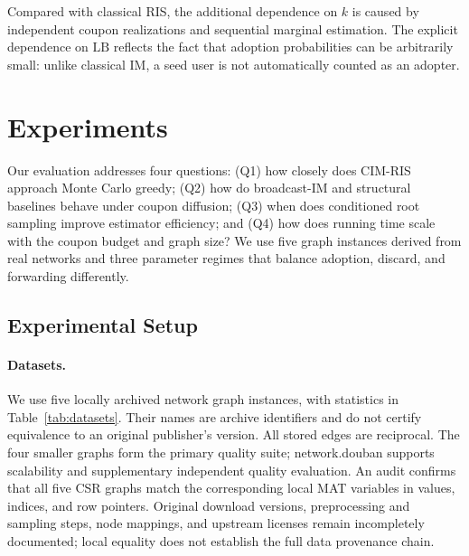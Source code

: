 \documentclass[sigconf,balance=false]{acmart}
\newcommand{\CIMRIS}{\textsc{CIM-RIS}}
\begin{document}
Compared with classical RIS, the additional dependence on $k$ is caused
by independent coupon realizations and sequential marginal estimation.
The explicit dependence on $\mathrm{LB}$ reflects the fact that adoption
probabilities can be arbitrarily small: unlike classical IM, a seed user is
not automatically counted as an adopter.

\section{Experiments}
\label{sec:exp}

Our evaluation addresses four questions:
(Q1) how closely does \CIMRIS{} approach Monte Carlo greedy;
(Q2) how do broadcast-IM and structural baselines behave under coupon
diffusion; (Q3) when does conditioned root sampling improve estimator
efficiency; and (Q4) how does running time scale with the coupon budget
and graph size?
We use five graph instances derived from real networks and three parameter
regimes that balance adoption, discard, and forwarding differently.

\subsection{Experimental Setup}
\label{sec:exp-setup}

\paragraph{Datasets.}
We use five locally archived network graph instances, with statistics in
Table~\ref{tab:datasets}. Their names are archive identifiers and do not
certify equivalence to an original publisher's version.
All stored edges are reciprocal. The four smaller graphs form the primary
quality suite; network.douban supports scalability and supplementary
independent quality evaluation.
An audit confirms that all five CSR graphs match the corresponding local
MAT variables in values, indices, and row pointers. Original download
versions, preprocessing and sampling steps, node mappings, and upstream
licenses remain incompletely documented; local equality does not establish
the full data provenance chain.
\end{document}

